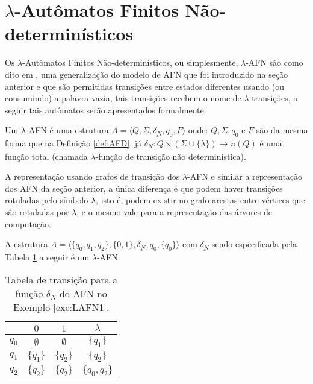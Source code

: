 \section{$\lambda$-Autômatos Finitos Não-determinísticos}\label{sec:LAFN}

Os $\lambda$-Autômatos Finitos Não-determinísticos, ou simplesmente, $\lambda$-AFN são como dito em \cite{menezes1998LFA}, uma generalização do modelo de AFN que foi introduzido na seção anterior e que são permitidas transições entre estados diferentes usando (ou consumindo) a palavra vazia, tais transições recebem o nome de $\lambda$-transições, a seguir tais autômatos serão apresentados formalmente.

\begin{definition}\label{def:LAFN}
	Um $\lambda$-AFN é uma estrutura $A = \langle Q, \Sigma, \underline{\delta_N}, q_0, F\rangle$ onde: $Q, \Sigma, q_0$ e $F$ são da mesma forma que na Definição \ref{def:AFD}, já $\underline{\delta_N} : Q \times (\Sigma \cup \{\lambda\}) \rightarrow \wp(Q)$ é uma função total (chamada $\lambda$-função de transição não determinística).
\end{definition}

A representação usando grafos de transição dos $\lambda$-AFN e similar a representação dos AFN da seção anterior, a única diferença é que podem haver transições rotuladas pelo símbolo $\lambda$, isto é, podem existir no grafo arestas entre vértices que são rotuladas por $\lambda$, e o mesmo vale para a representação das árvores de computação.

\begin{example}\label{exe:LAFN1}
	A estrutura $A = \langle \{q_0, q_1, q_2\}, \{0,1\}, \underline{\delta_N}, q_0, \{q_0\}\rangle$ com $\underline{\delta_N}$ sendo especificada pela Tabela \ref{tab:DeltaLAFN1} a seguir é um $\lambda$-AFN.
	
	\begin{table}[h]
		\centering
		\scriptsize
		\begin{tabular}{c|ccc}
			\backslashbox{$Q$}{$\Sigma \cup \{\lambda\}$}	& $0$ & $1$ & $\lambda$\\ \hline
			$q_0$  & $\emptyset$ & $\emptyset$ & $\{q_1\}$\\
			$q_1$  & $\{q_1\}$ & $\{q_2\}$ & $\{q_2\}$\\
			$q_2$  & $\{q_2\}$ & $\{q_2\}$ & $\{q_0, q_2\}$ \\ \hline
		\end{tabular}
		\caption{Tabela de transição para a função $\delta_N$ do AFN no Exemplo \ref{exe:LAFN1}.}
		\label{tab:DeltaLAFN1}
	\end{table}
\end{example} 

